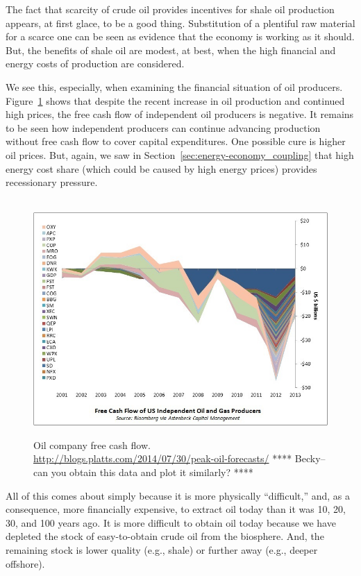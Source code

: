 The fact that scarcity of crude oil provides incentives for shale oil production
appears, at first glace, to be a good thing.
Substitution of a plentiful raw material for a scarce one 
can be seen as evidence that the economy is working as it should.
But, the benefits of shale oil are modest, at best, when the
high financial and energy costs of production are considered.

We see this, especially, when examining the financial situation of oil producers.
Figure~\ref{fig:oil_company_free_cash_flow} 
shows that despite the recent increase in oil production
and continued high prices, 
the free cash flow of independent oil producers is negative.
It remains to be seen how independent producers can continue advancing 
production without free cash flow to cover capital expenditures.
One possible cure is higher oil prices.
But, again, we saw 
in Section~\ref{sec:energy-economy_coupling}
that high energy cost share 
(which could be caused by high energy prices)
provides recessionary pressure.

\begin{figure}[!ht]
\centering\
\includegraphics[width=\linewidth]{Part_0/Chapter_Introduction/images/Cash-Flow.jpg}
\caption[Oil company free cash flow]{Oil company free cash flow.
\url{http://blogs.platts.com/2014/07/30/peak-oil-forecasts/}
**** Becky--can you obtain this data and plot it similarly? ****
}
\label{fig:oil_company_free_cash_flow}
\end{figure}

All of this comes about simply because it is 
more physically ``difficult,'' and, as a consequence, 
more financially expensive, 
to extract oil today than it was 10, 20, 30, and 100 years ago.
It is more difficult to obtain oil today because we have depleted
the stock of easy-to-obtain crude oil from the biosphere.
And, the remaining stock is lower quality (e.g., shale)
or further away (e.g., deeper offshore).

